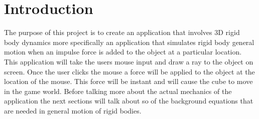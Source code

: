 \section{Introduction}
The purpose of this project is to create an application that involves 3D rigid body dynamics more specifically an application that simulates rigid body general motion when an impulse force is added to the object at a particular location.
This application will take the users mouse input and draw a ray to the object on screen.
Once the user clicks the mouse a force will be applied to the object at the location of the mouse.
This force will be instant and will cause the cube to move in the game world.
Before talking more about the actual mechanics of the application the next sections will talk about so of the background equations that are needed in general motion of rigid bodies.